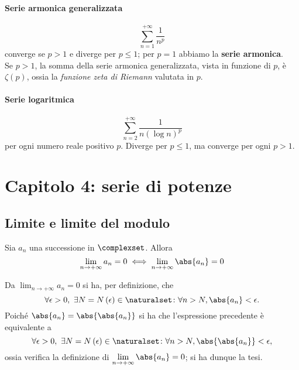 \paragraph{Serie armonica generalizzata}
	\begin{equation}
		\sum_{n=1}^{+\infty}\frac{1}{n^p}
	\end{equation}
	converge se $p>1$ e diverge per $p\leq 1$; per $p=1$ abbiamo la \textbf{serie armonica}.\\
	Se $p>1$, la somma della serie armonica generalizzata, vista in funzione di $p$, è $\zeta\left(p\right)$, ossia la \textit{funzione zeta di Riemann} valutata in $p$.
\paragraph{Serie logaritmica}
	\begin{equation}
		\sum_{n=2}^{+\infty}\frac{1}{n\left(\log n\right)^p}
	\end{equation}
	per ogni numero reale positivo $p$. Diverge per $p\leq 1$, ma converge per ogni $p>1$.
\section{Capitolo 4: serie di potenze}
\subsection{Limite e limite del modulo}
\begin{proposition}\label{equivalenzalimiteemodulolimite}
	Sia $a_n$ una successione in $\complexset$. Allora
	\begin{equation}
		\lim_{n\to+\infty}a_n=0\iff\lim_{n\to+\infty}\abs{a_n}=0
	\end{equation}
\end{proposition}
\begin{demonstration}
	Da $\displaystyle\lim_{n\to+\infty}a_n=0$ si ha, per definizione, che
	\begin{equation*}
		\forall \epsilon>0,\ \exists N=N\left(\epsilon\right)\in\naturalset\colon\forall n>N, \abs{a_n}<\epsilon.
	\end{equation*}
	Poiché $\abs{a_n}=\abs{\abs{a_n}}$ si ha che l'espressione precedente è equivalente a
	\begin{equation*}
		\forall \epsilon>0,\ \exists N=N\left(\epsilon\right)\in\naturalset\colon\forall n>N, \abs{\abs{a_n}}<\epsilon,
	\end{equation*}
	ossia verifica la definizione di $\displaystyle\lim_{n\to+\infty}\abs{a_n}=0$; si ha dunque la tesi.
\end{demonstration}
